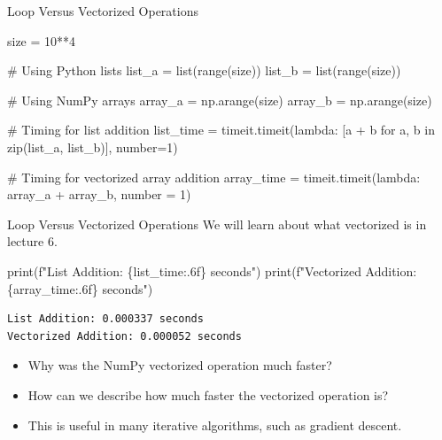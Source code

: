 \documentclass[
  ignorenonframetext,
]{beamer}
\newenvironment{Shaded}{\begin{snugshade}}{\end{snugshade}}
\newcommand{\BuiltInTok}[1]{\textcolor[rgb]{0.00,0.23,0.31}{#1}}
\newcommand{\CommentTok}[1]{\textcolor[rgb]{0.37,0.37,0.37}{#1}}
\newcommand{\ControlFlowTok}[1]{\textcolor[rgb]{0.00,0.23,0.31}{#1}}
\newcommand{\DecValTok}[1]{\textcolor[rgb]{0.68,0.00,0.00}{#1}}
\newcommand{\KeywordTok}[1]{\textcolor[rgb]{0.00,0.23,0.31}{#1}}
\newcommand{\NormalTok}[1]{\textcolor[rgb]{0.00,0.23,0.31}{#1}}
\newcommand{\OperatorTok}[1]{\textcolor[rgb]{0.37,0.37,0.37}{#1}}
\newcommand{\SpecialCharTok}[1]{\textcolor[rgb]{0.37,0.37,0.37}{#1}}
\newcommand{\SpecialStringTok}[1]{\textcolor[rgb]{0.13,0.47,0.30}{#1}}
\begin{document}
\begin{frame}[fragile]{Loop Versus Vectorized Operations}
\protect\hypertarget{loop-versus-vectorized-operations}{}
\begin{Shaded}
\begin{Highlighting}[]
\NormalTok{size }\OperatorTok{=} \DecValTok{10}\OperatorTok{**}\DecValTok{4}

\CommentTok{\# Using Python lists}
\NormalTok{list\_a }\OperatorTok{=} \BuiltInTok{list}\NormalTok{(}\BuiltInTok{range}\NormalTok{(size))}
\NormalTok{list\_b }\OperatorTok{=} \BuiltInTok{list}\NormalTok{(}\BuiltInTok{range}\NormalTok{(size))}

\CommentTok{\# Using NumPy arrays}
\NormalTok{array\_a }\OperatorTok{=}\NormalTok{ np.arange(size)}
\NormalTok{array\_b }\OperatorTok{=}\NormalTok{ np.arange(size)}

\CommentTok{\# Timing for list addition}
\NormalTok{list\_time }\OperatorTok{=}\NormalTok{ timeit.timeit(}\KeywordTok{lambda}\NormalTok{: }
\NormalTok{  [a }\OperatorTok{+}\NormalTok{ b }\ControlFlowTok{for}\NormalTok{ a, b }\KeywordTok{in} \BuiltInTok{zip}\NormalTok{(list\_a, list\_b)], number}\OperatorTok{=}\DecValTok{1}\NormalTok{)}

\CommentTok{\# Timing for vectorized array addition}
\NormalTok{array\_time }\OperatorTok{=}\NormalTok{ timeit.timeit(}\KeywordTok{lambda}\NormalTok{: }
\NormalTok{  array\_a }\OperatorTok{+}\NormalTok{ array\_b, number }\OperatorTok{=} \DecValTok{1}\NormalTok{)}
\end{Highlighting}
\end{Shaded}
\end{frame}

\begin{frame}[fragile]{Loop Versus Vectorized Operations}
\protect\hypertarget{loop-versus-vectorized-operations-1}{}
We will learn about what vectorized is in lecture 6.

\begin{Shaded}
\begin{Highlighting}[]
\BuiltInTok{print}\NormalTok{(}\SpecialStringTok{f"List Addition: }\SpecialCharTok{\{}\NormalTok{list\_time}\SpecialCharTok{:.6f\}}\SpecialStringTok{ seconds"}\NormalTok{)}
\BuiltInTok{print}\NormalTok{(}\SpecialStringTok{f"Vectorized Addition: }\SpecialCharTok{\{}\NormalTok{array\_time}\SpecialCharTok{:.6f\}}\SpecialStringTok{ seconds"}\NormalTok{)}
\end{Highlighting}
\end{Shaded}

\begin{verbatim}
List Addition: 0.000337 seconds
Vectorized Addition: 0.000052 seconds
\end{verbatim}

\begin{itemize}
\item
  Why was the NumPy vectorized operation much faster?
\item
  How can we describe how much faster the vectorized operation is?
\item
  This is useful in many iterative algorithms, such as gradient descent.
\end{itemize}
\end{frame}
\end{document}
